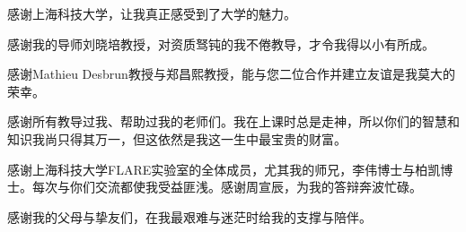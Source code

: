 \begin{acknowledgement}
    感谢上海科技大学，让我真正感受到了大学的魅力。

    感谢我的导师刘晓培教授，对资质驽钝的我不倦教导，才令我得以小有所成。

    感谢Mathieu Desbrun教授与郑昌熙教授，能与您二位合作并建立友谊是我莫大的荣幸。

    感谢所有教导过我、帮助过我的老师们。我在上课时总是走神，所以你们的智慧和知识我尚只得其万一，但这依然是我这一生中最宝贵的财富。

    感谢上海科技大学FLARE实验室的全体成员，尤其我的师兄，李伟博士与柏凯博士。每次与你们交流都使我受益匪浅。感谢周宣辰，为我的答辩奔波忙碌。

    感谢我的父母与挚友们，在我最艰难与迷茫时给我的支撑与陪伴。
\end{acknowledgement}